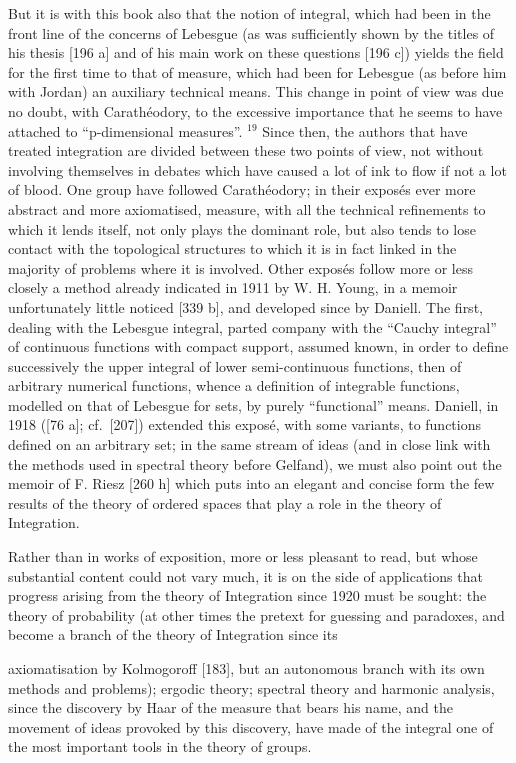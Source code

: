 But it is with this book also that the notion of integral, which had been in the front line of the concerns of Lebesgue (as was sufficiently shown by the titles of his thesis {[}196 a{]} and of his main work on these questions {[}196 c{]}) yields the field for the first time to that of measure, which had been for Lebesgue (as before him with Jordan) an auxiliary technical means. This change in point of view was due no doubt, with Carathéodory, to the excessive importance that he seems to have attached to ``p-dimensional measures''. \(^{19}\) Since then, the authors that have treated integration are divided between these two points of view, not without involving themselves in debates which have caused a lot of ink to flow if not a lot of blood. One group have followed Carathéodory; in their exposés ever more abstract and more axiomatised, measure, with all the technical refinements to which it lends itself, not only plays the dominant role, but also tends to lose contact with the topological structures to which it is in fact linked in the majority of problems where it is involved. Other exposés follow more or less closely a method already indicated in 1911 by W. H. Young, in a memoir unfortunately little noticed {[}339 b{]}, and developed since by Daniell. The first, dealing with the Lebesgue integral, parted company with the ``Cauchy integral'' of continuous functions with compact support, assumed known, in order to define successively the upper integral of lower semi-continuous functions, then of arbitrary numerical functions, whence a definition of integrable functions, modelled on that of Lebesgue for sets, by purely ``functional'' means. Daniell, in 1918 ({[}76 a{]}; cf.~{[}207{]}) extended this exposé, with some variants, to functions defined on an arbitrary set; in the same stream of ideas (and in close link with the methods used in spectral theory before Gelfand), we must also point out the memoir of F. Riesz {[}260 h{]} which puts into an elegant and concise form the few results of the theory of ordered spaces that play a role in the theory of Integration.

Rather than in works of exposition, more or less pleasant to read, but whose substantial content could not vary much, it is on the side of applications that progress arising from the theory of Integration since 1920 must be sought: the theory of probability (at other times the pretext for guessing and paradoxes, and become a branch of the theory of Integration since its

axiomatisation by Kolmogoroff {[}183{]}, but an autonomous branch with its own methods and problems); ergodic theory; spectral theory and harmonic analysis, since the discovery by Haar of the measure that bears his name, and the movement of ideas provoked by this discovery, have made of the integral one of the most important tools in the theory of groups.
\relax{}
